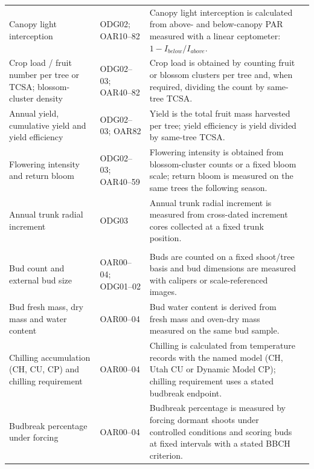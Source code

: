 \begin{landscape}
\begin{longtable}{>{\RaggedRight\arraybackslash}p{5.1cm} >{\RaggedRight\arraybackslash}p{2.3cm} >{\RaggedRight\arraybackslash}p{16.7cm} >{\RaggedRight\arraybackslash}p{2.4cm}}
Canopy light interception &
ODG02; OAR10--82 &
Canopy light interception is calculated from above- and below-canopy PAR measured with a linear ceptometer: $1-I_{below}/I_{above}$. &
\citep{middleton2002}\\

Crop load / fruit number per tree or TCSA; blossom-cluster density &
ODG02--03; OAR40--82 &
Crop load is obtained by counting fruit or blossom clusters per tree and, when required, dividing the count by same-tree TCSA. &
\citep{stover2001,serra2016}\\

Annual yield, cumulative yield and yield efficiency &
ODG02--03; OAR82 &
Yield is the total fruit mass harvested per tree; yield efficiency is yield divided by same-tree TCSA. &
\citep{plavcova2022,stover2001}\\

Flowering intensity and return bloom &
ODG02--03; OAR40--59 &
Flowering intensity is obtained from blossom-cluster counts or a fixed bloom scale; return bloom is measured on the same trees the following season. &
\citep{plavcova2022,serra2016}\\

Annual trunk radial increment &
ODG03 &
Annual trunk radial increment is measured from cross-dated increment cores collected at a fixed trunk position. &
\citep{plavcova2022}\\

\multicolumn{4}{l}{\textbf{Bud, dormancy and reserve status}}\\
Bud count and external bud size &
OAR00--04; ODG01--02 &
Buds are counted on a fixed shoot/tree basis and bud dimensions are measured with calipers or scale-referenced images. &
\citep{labuschagne2003,upov2023apple}\\

Bud fresh mass, dry mass and water content &
OAR00--04 &
Bud water content is derived from fresh mass and oven-dry mass measured on the same bud sample. &
\citep{milyaev2024}\\

Chilling accumulation (CH, CU, CP) and chilling requirement &
OAR00--04 &
Chilling is calculated from temperature records with the named model (CH, Utah CU or Dynamic Model CP); chilling requirement uses a stated budbreak endpoint. &
\citep{parkes2020,sapkota2021,milyaev2024}\\

Budbreak percentage under forcing &
OAR00--04 &
Budbreak percentage is measured by forcing dormant shoots under controlled conditions and scoring buds at fixed intervals with a stated BBCH criterion. &
\citep{milyaev2024}\\


\end{longtable}
\end{landscape}
